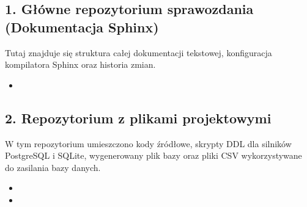 \documentclass[a4paper,11pt,english,openany,oneside]{sphinxmanual}
\begin{document}
\subsection{1. Główne repozytorium sprawozdania (Dokumentacja Sphinx)}
\label{\detokenize{rozdzial_1/index:glowne-repozytorium-sprawozdania-dokumentacja-sphinx}}
\sphinxAtStartPar
Tutaj znajduje się struktura całej dokumentacji tekstowej, konfiguracja kompilatora Sphinx oraz historia zmian.
\begin{itemize}
\item {} 
\sphinxAtStartPar
{} 

\end{itemize}


\subsection{2. Repozytorium z plikami projektowymi}
\label{\detokenize{rozdzial_1/index:repozytorium-z-plikami-projektowymi}}
\sphinxAtStartPar
W tym repozytorium umieszczono kody źródłowe, skrypty DDL dla silników PostgreSQL i SQLite, wygenerowany plik bazy oraz pliki CSV wykorzystywane do zasilania bazy danych.
\begin{itemize}
\item {} 
\sphinxAtStartPar
{} 

\item {} 
\sphinxAtStartPar
{} 

\end{itemize}
\end{document}
